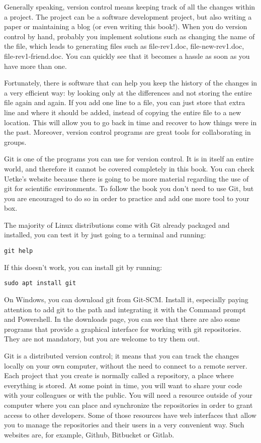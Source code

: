 Generally speaking, version control means keeping track of all the changes within a project. The project can be a software development project, but also writing a paper or maintaining a blog (or even writing this book!). When you do version control by hand, probably you implement solutions such as changing the name of the file, which leads to generating files such as file-rev1.doc, file-new-rev1.doc, file-rev1-friend.doc. You can quickly see that it becomes a hassle as soon as you have more than one.

Fortunately, there is software that can help you keep the history of the changes in a very efficient way: by looking only at the differences and not storing the entire file again and again. If you add one line to a file, you can just store that extra line and where it should be added, instead of copying the entire file to a new location. This will allow you to go back in time and recover to how things were in the past. Moreover, version control programs are great tools for collaborating in groups.

Git is one of the programs you can use for version control. It is in itself an entire world, and therefore it cannot be covered completely in this book. You can check Uetke’s website because there is going to be more material regarding the use of git for scientific environments. To follow the book you don’t need to use Git, but you are encouraged to do so in order to practice and add one more tool to your box.

The majority of Linux distributions come with Git already packaged and installed, you can test it by just going to a terminal and running:
\begin{verbatim}
git help
\end{verbatim}
If this doesn’t work, you can install git by running:
\begin{verbatim}
sudo apt install git
\end{verbatim}

On Windows, you can download git from Git-SCM. Install it, especially paying attention to add git to the path and integrating it with the Command prompt and Powershell. In the downloads page, you can see that there are also some programs that provide a graphical interface for working with git repositories. They are not mandatory, but you are welcome to try them out.

Git is a distributed version control; it means that you can track the changes locally on your own computer, without the need to connect to a remote server. Each project that you create is normally called a repository, a place where everything is stored. At some point in time, you will want to share your code with your colleagues or with the public. You will need a resource outside of your computer where you can place and synchronize the repositories in order to grant access to other developers. Some of those resources have web interfaces that allow you to manage the repositories and their users in a very convenient way. Such websites are, for example, Github, Bitbucket or Gitlab.

